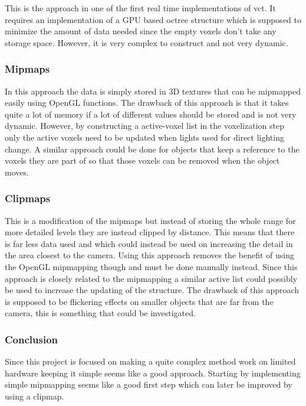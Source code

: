 \documentclass[a4paper, 12pt]{article}
\begin{document}
This is the approach in one of the first real time implementations of \gls{vct}. It requires an implementation of a GPU based octree structure which is supposed to minimize the amount of data needed since the empty voxels don't take any storage space. However, it is very complex to construct and not very dynamic.

\subsubsection{Mipmaps}

In this approach the data is simply stored in 3D textures that can be mipmapped easily using OpenGL functions. The drawback of this approach is that it takes quite a lot of memory if a lot of different values should be stored and is not very dynamic. However, by constructing a active-voxel list in the voxelization step only the active voxels need to be updated when lights used for direct lighting change. A similar approach could be done for objects that keep a reference to the voxels they are part of so that those voxels can be removed when the object moves.

\subsubsection{Clipmaps}

This is a modification of the mipmaps but instead of storing the whole range for more detailed levels they are instead clipped by distance. This means that there is far less data used and which could instead be used on increasing the detail in the area closest to the camera. Using this approach removes the benefit of using the OpenGL mipmapping though and must be done manually instead. Since this approach is closely related to the mipmapping a similar active list could possibly be used to increase the updating of the structure. The drawback of this approach is supposed to be flickering effects on smaller objects that are far from the camera, this is something that could be investigated.

\subsubsection{Conclusion}

Since this project is focused on making a quite complex method work on limited hardware keeping it simple seems like a good approach. Starting by implementing simple mipmapping seems like a good first step which can later be improved by using a clipmap.
\end{document}
